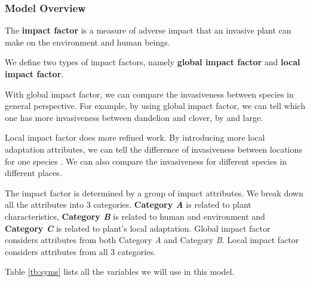 \documentclass[12pt]{article}
\begin{document}
	\subsubsection{Model Overview}
		
		The \textbf{impact factor} is a measure of adverse impact that an invasive plant can make on the environment and human beings.  
		
		We define two types of impact factors, namely \textbf{global impact factor} and \textbf{local impact factor}. 
		
		With global impact factor, we can compare the invasiveness between species in general perspective.  For example, by using global impact factor, we can tell which one has more invasiveness between dandelion and clover, by and large.
		
		Local impact factor does more refined work.  By introducing more local adaptation attributes, we can tell the difference of invasiveness between locations for one species .  We can also compare the invasiveness for different species in different places.
		
		The impact factor is determined by a group of impact attributes.  We break down all the attributes into 3 categories.  \textbf{Category \textit{A}} is related to plant characteristics, \textbf{Category \textit{B}} is related to human and environment and \textbf{Category \textit{C}} is related to plant's local adaptation.  Global impact factor considers attributes from both Category \textit{A} and Category \textit{B}.  Local impact factor considers attributes from all 3 categories.
		
		Table \ref{tb:syms} lists all the variables we will use in this model.
		
\end{document}
